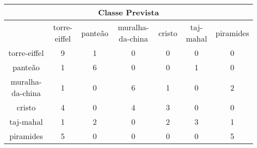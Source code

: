 \begin{tabular}{|c|c|c|c|c|c|c|}
\hline
\multicolumn{7}{|c|}{Classe Prevista}\\
\hline
 & torre-eiffel & panteão & muralha-da-china & cristo & taj-mahal & piramides\\
torre-eiffel & 9 & 1 & 0 & 0 & 0 & 0\\
panteão & 1 & 6 & 0 & 0 & 1 & 0\\
muralha-da-china & 1 & 0 & 6 & 1 & 0 & 2\\
cristo & 4 & 0 & 4 & 3 & 0 & 0\\
taj-mahal & 1 & 2 & 0 & 2 & 3 & 1\\
piramides & 5 & 0 & 0 & 0 & 0 & 5\\
\hline
\end{tabular}
